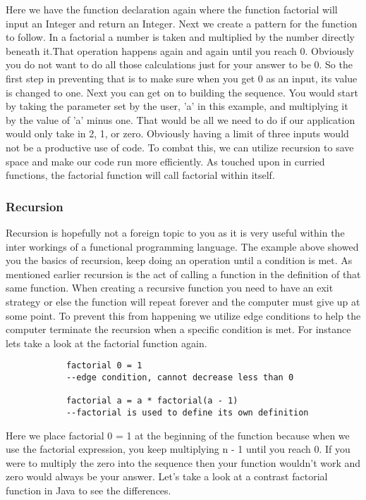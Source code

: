 \documentclass{article}
\begin{document}
        \noindent Here we have the function declaration again where the function factorial will input an Integer and return an Integer. Next we create a pattern for the function to follow. In a factorial a number is taken and multiplied by the number directly beneath it.That operation happens again and again until you reach 0. Obviously you do not want to do all those calculations just for your answer to be 0. So the first step in preventing that is to make sure when you get 0 as an input, its value is changed to one. Next you can get on to building the sequence. You would start by taking the parameter set by the user, 'a' in this example, and multiplying it by the value of 'a' minus one. That would be all we need to do if our application would only take in 2, 1, or zero. Obviously having a limit of three inputs would not be a productive use of code. To combat this, we can utilize recursion to save space and make our code run more efficiently. As touched upon in curried functions, the factorial function will call factorial within itself. 
        
        \subsubsection{Recursion}
        Recursion is hopefully not a foreign topic to you as it is very useful within the inter workings of a functional programming language. The example above showed you the basics of recursion, keep doing an operation until a condition is met. As mentioned earlier recursion is the act of calling a function in the definition of that same function. When creating a recursive function you need to have an exit strategy or else the function will repeat forever and the computer must give up at some point. To prevent this from happening we utilize edge conditions to help the computer terminate the recursion when a specific condition is met. For instance lets take a look at the factorial function again.
        
        \begin{lstlisting}
            factorial 0 = 1
            --edge condition, cannot decrease less than 0
            
            factorial a = a * factorial(a - 1)
            --factorial is used to define its own definition
        \end{lstlisting}
        
        \noindent Here we place factorial 0 = 1 at the beginning of the function because when we use the factorial expression, you keep multiplying n - 1 until you reach 0. If you were to multiply the zero into the sequence then your function wouldn't work and zero would always be your answer. Let's take a look at a contrast factorial function in Java to see the differences.
        
\end{document}

